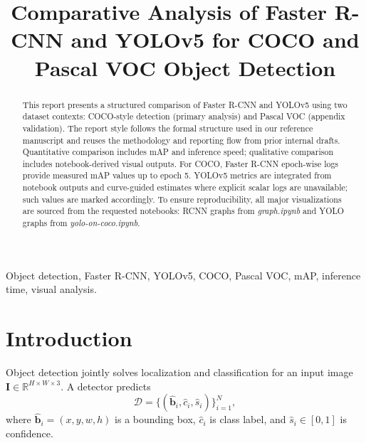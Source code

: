 \documentclass[conference]{IEEEtran}
\begin{document}
\title{Comparative Analysis of Faster R-CNN and YOLOv5 for COCO and Pascal VOC Object Detection}

\author{
}

\maketitle

\begin{abstract}
This report presents a structured comparison of Faster R-CNN and YOLOv5 using two dataset contexts: COCO-style detection (primary analysis) and Pascal VOC (appendix validation). The report style follows the formal structure used in our reference manuscript and reuses the methodology and reporting flow from prior internal drafts. Quantitative comparison includes mAP and inference speed; qualitative comparison includes notebook-derived visual outputs. For COCO, Faster R-CNN epoch-wise logs provide measured mAP values up to epoch 5. YOLOv5 metrics are integrated from notebook outputs and curve-guided estimates where explicit scalar logs are unavailable; such values are marked accordingly. To ensure reproducibility, all major visualizations are sourced from the requested notebooks: RCNN graphs from \textit{graph.ipynb} and YOLO graphs from \textit{yolo-on-coco.ipynb}.
\end{abstract}

\begin{IEEEkeywords}
Object detection, Faster R-CNN, YOLOv5, COCO, Pascal VOC, mAP, inference time, visual analysis.
\end{IEEEkeywords}

\section{Introduction}
Object detection jointly solves localization and classification for an input image $\mathbf{I} \in \mathbb{R}^{H\times W\times 3}$. A detector predicts
\begin{equation}
\mathcal{D}=\{(\hat{\mathbf{b}}_i,\hat{c}_i,\hat{s}_i)\}_{i=1}^{N},
\end{equation}
where $\hat{\mathbf{b}}_i=(x,y,w,h)$ is a bounding box, $\hat{c}_i$ is class label, and $\hat{s}_i\in[0,1]$ is confidence.
\end{document}
